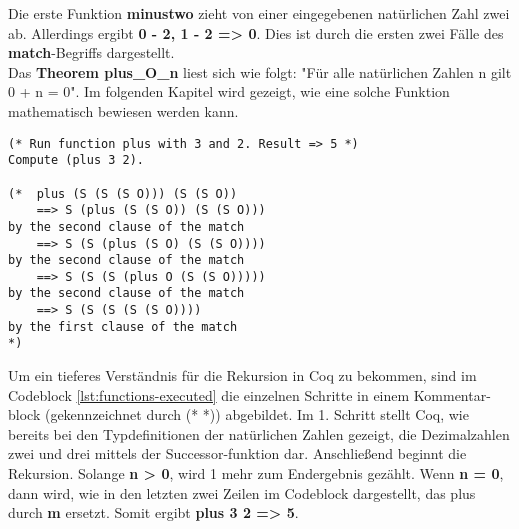 Die erste Funktion \textbf{minustwo} zieht von einer eingegebenen natürlichen Zahl zwei ab. Allerdings ergibt \textbf{0 - 2, 1 - 2 => 0}. Dies ist durch die ersten zwei Fälle des \textbf{match}-Begriffs dargestellt.\\
Das \textbf{Theorem plus\_O\_n} liest sich wie folgt: "Für alle natürlichen Zahlen n gilt 0 + n = 0". Im folgenden Kapitel wird gezeigt, wie eine solche Funktion mathematisch bewiesen werden kann.

\begin{lstlisting}[language=coq,firstnumber=1,caption=Coq rekursive Funktion,label=lst:functions-executed]
(* Run function plus with 3 and 2. Result => 5 *)
Compute (plus 3 2).

(*  plus (S (S (S O))) (S (S O))
	==> S (plus (S (S O)) (S (S O)))
by the second clause of the match
	==> S (S (plus (S O) (S (S O))))
by the second clause of the match
	==> S (S (S (plus O (S (S O)))))
by the second clause of the match
	==> S (S (S (S (S O))))
by the first clause of the match
*)
\end{lstlisting}
Um ein tieferes Verständnis für die Rekursion in Coq zu bekommen, sind im Codeblock \ref{lst:functions-executed} die einzelnen Schritte in einem Kommentar-block (gekennzeichnet durch (* *)) abgebildet. Im 1. Schritt stellt Coq, wie bereits bei den Typdefinitionen der natürlichen Zahlen gezeigt, die Dezimalzahlen zwei und drei mittels der Successor-funktion dar. Anschließend beginnt die Rekursion. Solange \textbf{n > 0}, wird 1 mehr zum Endergebnis gezählt. Wenn \textbf{n = 0}, dann wird, wie in den letzten zwei Zeilen im Codeblock dargestellt, das plus durch \textbf{m} ersetzt. Somit ergibt \textbf{plus 3 2 => 5}.

